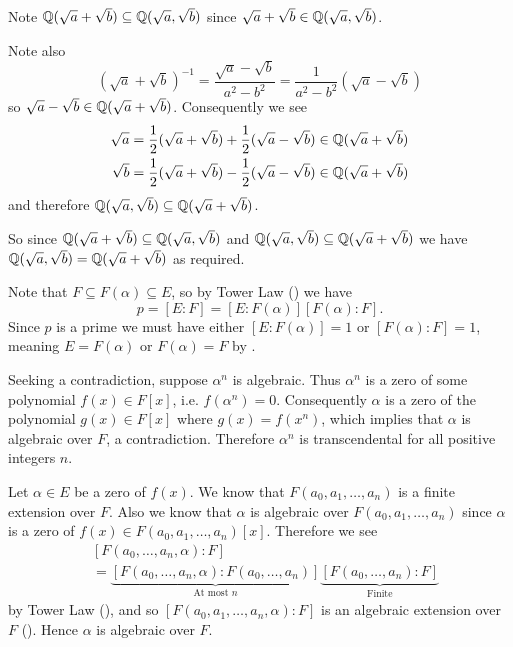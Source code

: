 \begin{questions}
    \item Note $\mathbb{Q}(\sqrt a + \sqrt b) \subseteq \mathbb{Q}(\sqrt a, \sqrt b)$ since $\sqrt a + \sqrt b \in \mathbb{Q}(\sqrt a, \sqrt b)$.

    Note also
    \[
        (\sqrt a + \sqrt b)^{-1} = \frac{\sqrt a - \sqrt b}{a^2 - b^2} = \frac1{a^2-b^2}\left(\sqrt a - \sqrt b\right)
    \]
    so $\sqrt a - \sqrt b \in \mathbb{Q}(\sqrt a + \sqrt b)$. Consequently we see
    \begin{align*}
        \sqrt a &= \frac12(\sqrt a + \sqrt b) + \frac12(\sqrt a - \sqrt b) \in \mathbb{Q}(\sqrt a + \sqrt b)\\
        \sqrt b &= \frac12(\sqrt a + \sqrt b) - \frac12(\sqrt a - \sqrt b) \in \mathbb{Q}(\sqrt a + \sqrt b)
    \end{align*}
    and therefore $\mathbb{Q}(\sqrt a, \sqrt b) \subseteq \mathbb{Q}(\sqrt a + \sqrt b)$.

    So since $\mathbb{Q}(\sqrt a + \sqrt b) \subseteq \mathbb{Q}(\sqrt a, \sqrt b)$ and $\mathbb{Q}(\sqrt a, \sqrt b) \subseteq \mathbb{Q}(\sqrt a + \sqrt b)$ we have $\mathbb{Q}(\sqrt a, \sqrt b) = \mathbb{Q}(\sqrt a + \sqrt b)$ as required.

    \item Note that $F \subseteq F(\alpha) \subseteq E$, so by Tower Law () we have
    \[
        p = [E:F] = [E:F(\alpha)][F(\alpha):F].
    \]
    Since $p$ is a prime we must have either $[E:F(\alpha)] = 1$ or $[F(\alpha):F] = 1$, meaning $E = F(\alpha)$ or $F(\alpha) = F$ by .

    \item Seeking a contradiction, suppose $\alpha^n$ is algebraic. Thus $\alpha^n$ is a zero of some polynomial $f(x) \in F[x]$, i.e. $f(\alpha^n) = 0$. Consequently $\alpha$ is a zero of the polynomial $g(x) \in F[x]$ where $g(x) = f(x^n)$, which implies that $\alpha$ is algebraic over $F$, a contradiction. Therefore $\alpha^n$ is transcendental for all positive integers $n$.

    \item \begin{partquestions}{\roman*}
        \item Let $\alpha \in E$ be a zero of $f(x)$. We know that $F(a_0, a_1, \dots, a_n)$ is a finite extension over $F$. Also we know that $\alpha$ is algebraic over $F(a_0, a_1, \dots, a_n)$ since $\alpha$ is a zero of $f(x) \in F(a_0, a_1, \dots, a_n)[x]$. Therefore we see
        \begin{align*}
            &[F(a_0, \dots, a_n, \alpha):F]\\
            &= \underbrace{[F(a_0, \dots, a_n, \alpha):F(a_0, \dots, a_n)]}_{\text{At most } n}\underbrace{[F(a_0, \dots, a_n):F]}_{\text{Finite}}
        \end{align*}
        by Tower Law (), and so $[F(a_0, a_1, \dots, a_n, \alpha):F]$ is an algebraic extension over $F$ (). Hence $\alpha$ is algebraic over $F$.


\end{partquestions}
\end{questions}
